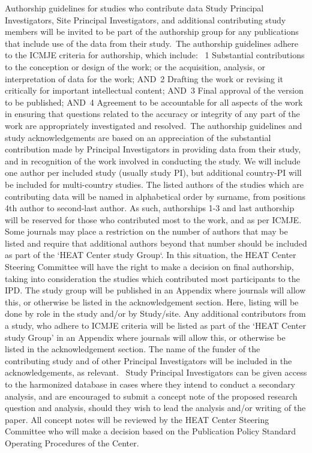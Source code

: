 \documentclass[12pt,letterpaper]{article}
\begin{document}
Authorship guidelines for studies who contribute data  Study Principal Investigators, Site Principal Investigators, and additional contributing study members will be invited to be part of the authorship group for any publications that include use of the data from their study.  The authorship guidelines adhere to the ICMJE criteria for authorship, which include:   1	Substantial contributions to the conception or design of the work; or the acquisition, analysis, or interpretation of data for the work; AND  2	Drafting the work or revising it critically for important intellectual content; AND  3	Final approval of the version to be published; AND  4	Agreement to be accountable for all aspects of the work in ensuring that questions related to the accuracy or integrity of any part of the work are appropriately investigated and resolved.  The authorship guidelines and study acknowledgements are based on an appreciation of the substantial contribution made by Principal Investigators in providing data from their study, and in recognition of the work involved in conducting the study.  We will include one author per included study (usually study PI), but additional country-PI will be included for multi-country studies. The listed authors of the studies which are contributing data will be named in alphabetical order by surname, from positions 4th author to second-last author. As such, authorships 1-3 and last authorship will be reserved for those who contributed most to the work, and as per ICMJE.  Some journals may place a restriction on the number of authors that may be listed and require that additional authors beyond that number should be included as part of the ‘HEAT Center study Group‘. In this situation, the HEAT Center Steering Committee will have the right to make a decision on final authorship, taking into consideration the studies which contributed most participants to the IPD.  The study group will be published in an Appendix where journals will allow this, or otherwise be listed in the acknowledgement section. Here, listing will be done by role in the study and/or by Study/site. Any additional contributors from a study, who adhere to ICMJE criteria will be listed as part of the ‘HEAT Center study Group’ in an Appendix where journals will allow this, or otherwise be listed in the acknowledgement section.  The name of the funder of the contributing study and of other Principal Investigators will be included in the acknowledgements, as relevant.    Study Principal Investigators can be given access to the harmonized database in cases where they intend to conduct a secondary analysis, and are encouraged to submit a concept note of the proposed research question and analysis, should they wish to lead the analysis and/or writing of the paper. All concept notes will be reviewed by the HEAT Center Steering Committee who will make a decision based on the Publication Policy Standard Operating Procedures of the Center. 
\end{document}
